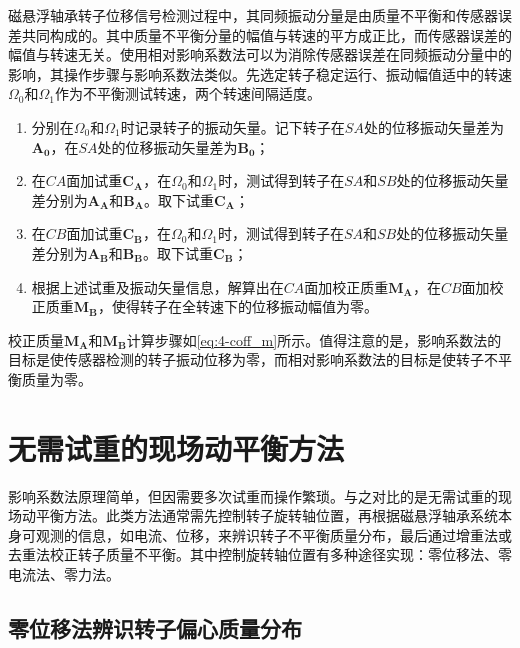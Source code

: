 \documentclass[
  lang=cn,
  degree=master,
  openany,oneside
]{nuaathesis}
\begin{document}
磁悬浮轴承转子位移信号检测过程中，其同频振动分量是由质量不平衡和传感器误差共同构成的。其中质量不平衡分量的幅值与转速的平方成正比，而传感器误差的幅值与转速无关。使用相对影响系数法可以为消除传感器误差在同频振动分量中的影响，其操作步骤与影响系数法类似。先选定转子稳定运行、振动幅值适中的转速$\Omega _0$和$\Omega _1$作为不平衡测试转速，两个转速间隔适度。
\begin{enumerate}
	\item 分别在$\Omega _0$和$\Omega _1$时记录转子的振动矢量。记下转子在$SA$处的位移振动矢量差为${\boldsymbol{A_0}}$，在$SA$处的位移振动矢量差为${\boldsymbol{B_0}}$；
	\item 在$CA$面加试重${\boldsymbol{C_A}}$，在$\Omega _0$和$\Omega _1$时，测试得到转子在$SA$和$SB$处的位移振动矢量差分别为${\boldsymbol{A_A}}$和${\boldsymbol{B_A}}$。取下试重${\boldsymbol{C_A}}$；
	\item 在$CB$面加试重${\boldsymbol{C_B}}$，在$\Omega _0$和$\Omega _1$时，测试得到转子在$SA$和$SB$处的位移振动矢量差分别为${\boldsymbol{A_B}}$和${\boldsymbol{B_B}}$。取下试重${\boldsymbol{C_B}}$；
	\item 根据上述试重及振动矢量信息，解算出在$CA$面加校正质重${\boldsymbol{M_A}}$，在$CB$面加校正质重${\boldsymbol{M_B}}$，使得转子在全转速下的位移振动幅值为零。
\end{enumerate}

校正质量${\boldsymbol{M_A}}$和${\boldsymbol{M_B}}$计算步骤如\autoref{eq:4-coff_m}所示。值得注意的是，影响系数法的目标是使传感器检测的转子振动位移为零，而相对影响系数法的目标是使转子不平衡质量为零。

\section{无需试重的现场动平衡方法}

影响系数法原理简单，但因需要多次试重而操作繁琐。与之对比的是无需试重的现场动平衡方法。此类方法通常需先控制转子旋转轴位置，再根据磁悬浮轴承系统本身可观测的信息，如电流、位移，来辨识转子不平衡质量分布，最后通过增重法或去重法校正转子质量不平衡。其中控制旋转轴位置有多种途径实现：零位移法、零电流法、零力法。

\subsection{零位移法辨识转子偏心质量分布}
\end{document}
